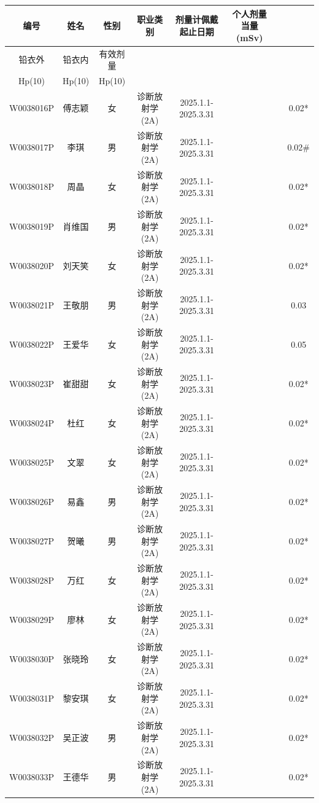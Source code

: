 \begin{table}[H]
\centering
\begin{tabular}{|c|c|c|c|c|c|c|c|}
\hline
编号 & 姓名 & 性别 & 职业类别 & 剂量计佩戴起止日期 & 个人剂量当量(mSv) &  &  \\
\hline
铅衣外 & 铅衣内 & 有效剂量 &  &  &  &  &  \\
\hline
Hp(10) & Hp(10) & Hp(10) &  &  &  &  &  \\
\hline
W0038016P & 傅志颖 & 女 & 诊断放射学(2A) & 2025.1.1-2025.3.31 &  &  & 0.02* \\
\hline
W0038017P & 李琪 & 男 & 诊断放射学(2A) & 2025.1.1-2025.3.31 &  &  & 0.02\# \\
\hline
W0038018P & 周晶 & 女 & 诊断放射学(2A) & 2025.1.1-2025.3.31 &  &  & 0.02* \\
\hline
W0038019P & 肖维国 & 男 & 诊断放射学(2A) & 2025.1.1-2025.3.31 &  &  & 0.02* \\
\hline
W0038020P & 刘天笑 & 女 & 诊断放射学(2A) & 2025.1.1-2025.3.31 &  &  & 0.02* \\
\hline
W0038021P & 王敬朋 & 男 & 诊断放射学(2A) & 2025.1.1-2025.3.31 &  &  & 0.03 \\
\hline
W0038022P & 王爱华 & 女 & 诊断放射学(2A) & 2025.1.1-2025.3.31 &  &  & 0.05 \\
\hline
W0038023P & 崔甜甜 & 女 & 诊断放射学(2A) & 2025.1.1-2025.3.31 &  &  & 0.02* \\
\hline
W0038024P & 杜红 & 女 & 诊断放射学(2A) & 2025.1.1-2025.3.31 &  &  & 0.02* \\
\hline
W0038025P & 文翠 & 女 & 诊断放射学(2A) & 2025.1.1-2025.3.31 &  &  & 0.02* \\
\hline
W0038026P & 易鑫 & 男 & 诊断放射学(2A) & 2025.1.1-2025.3.31 &  &  & 0.02* \\
\hline
W0038027P & 贺曦 & 男 & 诊断放射学(2A) & 2025.1.1-2025.3.31 &  &  & 0.02* \\
\hline
W0038028P & 万红 & 女 & 诊断放射学(2A) & 2025.1.1-2025.3.31 &  &  & 0.02* \\
\hline
W0038029P & 廖林 & 女 & 诊断放射学(2A) & 2025.1.1-2025.3.31 &  &  & 0.02* \\
\hline
W0038030P & 张晓玲 & 女 & 诊断放射学(2A) & 2025.1.1-2025.3.31 &  &  & 0.02* \\
\hline
W0038031P & 黎安琪 & 女 & 诊断放射学(2A) & 2025.1.1-2025.3.31 &  &  & 0.02* \\
\hline
W0038032P & 吴正波 & 男 & 诊断放射学(2A) & 2025.1.1-2025.3.31 &  &  & 0.02* \\
\hline
W0038033P & 王德华 & 男 & 诊断放射学(2A) & 2025.1.1-2025.3.31 &  &  & 0.02* \\

\end{tabular}
\end{table}
